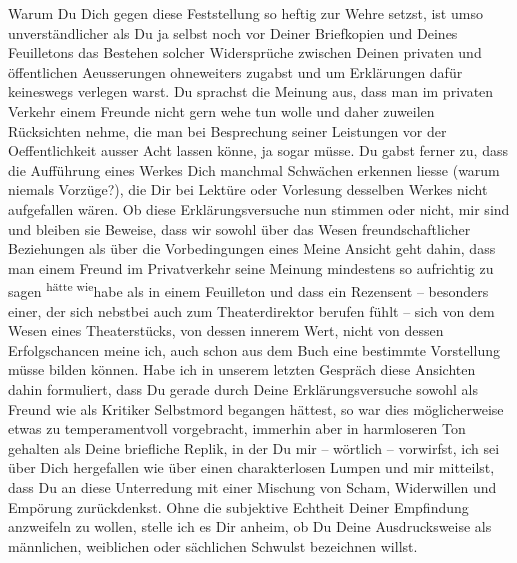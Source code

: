 \pstart
           Warum Du Dich gegen diese Feststellung so heftig zur Wehre setzst, ist umso
               unverständlicher als Du ja selbst noch vor \label{T_L03521-1v}\label{T_L03521-1} Deiner Briefkopien und Deines
                  Feuilletons das Bestehen
               solcher Widersprüche zwischen Deinen privaten und öffentlichen Aeusserungen
               ohneweiters zugabst und um Erklärungen dafür keineswegs verlegen warst. Du sprachst
               die Meinung aus, dass man im privaten Verkehr einem Freunde nicht gern wehe tun wolle
               und daher zuweilen Rücksichten nehme, die man bei Besprechung seiner Leistungen vor
               der Oeffentlichkeit ausser Acht lassen könne, ja sogar müsse. Du gabst ferner zu,
               dass die Aufführung eines Werkes Dich manchmal Schwächen erkennen liesse (warum
               niemals Vorzüge?), die Dir bei Lektüre oder Vorlesung desselben Werkes nicht
               aufgefallen wären. Ob diese Erklärungsversuche nun stimmen oder nicht, mir sind und
               bleiben sie Beweise, dass wir sowohl über das Wesen freundschaftlicher Beziehungen
               als über die Vorbedingungen eines \label{T_L03521-2v}\label{T_L03521-2}{ }{\pb}Meine Ansicht geht dahin, dass man
               einem Freund im Privatverkehr seine Meinung mindestens so aufrichtig zu sagen \substVorne{}\textsuperscript{hätte wie}\substDazwischen{}habe als\substHinten{} in einem Feuilleton und dass ein Rezensent – besonders einer, der sich
               nebstbei auch zum Theaterdirektor berufen fühlt – sich von dem Wesen eines
               Theaterstücks, von dessen innerem Wert, nicht von dessen Erfolgschancen meine ich,
               auch schon aus dem Buch eine bestimmte Vorstellung müsse bilden können. Habe ich in
               unserem letzten Gespräch diese Ansichten dahin formuliert, dass Du gerade durch Deine
               Erklärungsversuche sowohl als Freund wie als Kritiker Selbstmord begangen hättest, so
               war dies möglicherweise  etwas zu temperamentvoll
               vorgebracht, immerhin aber in harmloseren Ton gehalten als Deine briefliche Replik,
               in der Du mir – wörtlich – vorwirfst, ich sei über Dich hergefallen wie über einen
               charakterlosen Lumpen und mir mitteilst, dass Du an diese Unterredung mit einer
               Mischung von Scham, Widerwillen und Empörung zurückdenkst. Ohne die subjektive
               Echtheit Deiner Empfindung anzweifeln zu wollen, stelle ich es Dir anheim, ob Du
               Deine Ausdrucksweise als männlichen, weiblichen oder sächlichen Schwulst bezeichnen
               willst.\pend
           
